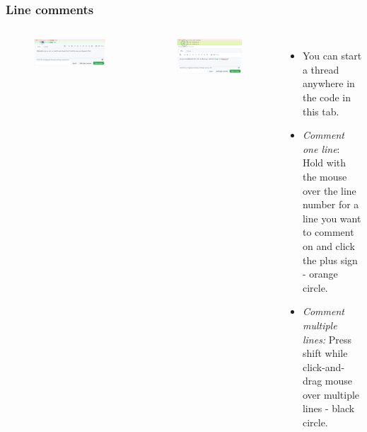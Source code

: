 \documentclass[aspectratio=169]{beamer}
\begin{document}
\begin{frame}
	\frametitle{Line comments}
	\begin{columns}[c]
		
		\vspace{-.4cm}
		\begin{figure}
			\centering
			\includegraphics[width=.9\textwidth]{./img/line-comment-1.png}
		\end{figure}
		\vspace{-.3cm}
		\begin{figure}
			\centering
			\includegraphics[width=.9\textwidth]{./img/line-comment-2.png}
		\end{figure}
		
		\begin{itemize}
			\setlength\itemsep{1em}
			\item You can start a thread anywhere in the code in this tab.
			\item \textit{Comment one line}: Hold with the mouse over the line number 
			for a line you want to comment on and click the plus sign - orange circle.
			\item \textit{Comment multiple lines:} Press shift while 
			click-and-drag mouse over multiple lines - black circle.
		\end{itemize}
		
	\end{columns}
\end{frame}
\end{document}
